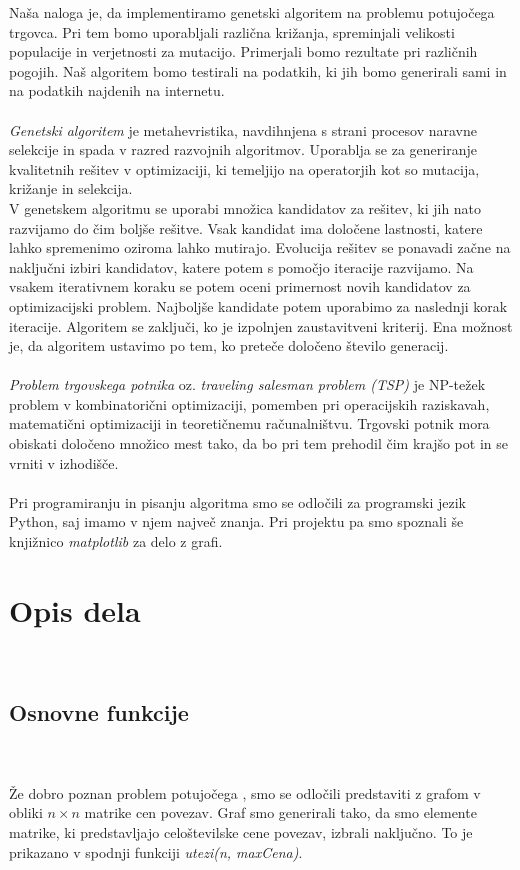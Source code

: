 \documentclass[12pt,a4paper]{amsart}
\theoremstyle{definition} %
\theoremstyle{plain} %
\begin{document}
Naša naloga je, da implementiramo genetski algoritem na problemu potujočega trgovca. Pri tem bomo uporabljali različna križanja, spreminjali velikosti populacije in verjetnosti za mutacijo. Primerjali bomo rezultate pri različnih pogojih. Naš algoritem bomo testirali na podatkih, ki jih bomo generirali sami in na podatkih najdenih na internetu. 
\\
\\
\textit{Genetski algoritem} je metahevristika, navdihnjena s strani procesov naravne selekcije in spada v razred razvojnih
algoritmov. Uporablja se za generiranje kvalitetnih rešitev v optimizaciji, ki temeljijo na operatorjih kot so mutacija, križanje
in selekcija.  
\\
V genetskem algoritmu se uporabi množica kandidatov za rešitev, ki jih nato razvijamo do čim boljše rešitve. Vsak kandidat
ima določene lastnosti, katere lahko spremenimo oziroma lahko mutirajo. Evolucija rešitev se ponavadi začne na naključni izbiri kandidatov, katere potem s pomočjo iteracije razvijamo. Na vsakem iterativnem koraku se potem oceni primernost novih kandidatov za optimizacijski problem. Najboljše kandidate potem uporabimo za naslednji korak iteracije. Algoritem se zaključi, ko je izpolnjen zaustavitveni kriterij. Ena možnost je, da algoritem ustavimo po tem, ko preteče določeno število generacij.
\\
\\
\textit{Problem trgovskega potnika} oz. \textit{traveling salesman problem (TSP)} je NP-težek problem v kombinatorični optimizaciji, pomemben pri operacijskih raziskavah, matematični optimizaciji in teoretičnemu računalništvu. Trgovski potnik mora obiskati določeno množico mest tako, da bo pri tem prehodil čim krajšo pot in se vrniti v izhodišče.
\\
\\
Pri programiranju in pisanju algoritma smo se odločili za programski jezik Python, saj imamo v njem največ znanja. Pri projektu pa smo spoznali še knjižnico \textit{matplotlib} za delo z grafi. 
\\

\newpage
\section{Opis dela}
\
\subsection{Osnovne funkcije}
\
\\
\\
Že dobro poznan problem potujočega , smo se odločili predstaviti z grafom v obliki $n \times n$ matrike cen povezav. Graf smo generirali tako, da smo elemente matrike, ki predstavljajo celoštevilske cene povezav, izbrali naključno. To je prikazano v spodnji funkciji \textit{utezi(n, maxCena)}.
\end{document}
